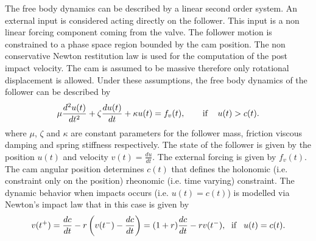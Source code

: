 The free body dynamics can be described by a linear second order
system. An external input is considered acting directly on the
follower. This input is a non linear forcing component coming from
the valve. The follower motion is constrained to a phase space
region bounded by the cam position. The non conservative Newton
restitution law is used for the computation of the post impact
velocity. The cam is assumed to be massive therefore only
rotational displacement is allowed. Under these assumptions, the
free body dynamics of the follower can be described by
\begin{eqnarray}
  \label{eq:sols}
  \mu\frac{d^2u(t)}{dt^2}+\zeta\frac{du(t)}{dt}+\kappa
  u(t)=f_{v}(t),  \; \text{\hspace{5mm} \text{if} \hspace{3mm}$u(t) > c(t)$.}
\end{eqnarray}
where $\mu$, $\zeta$ and $\kappa$ are constant parameters for the
follower mass, friction viscous damping and spring stiffness
 respectively. The state of the
follower is given by the position $u(t)$ and velocity
$v(t)={\frac{du}{dt}}$. The external forcing is given by $f_v(t)$.
The cam angular position determines $c(t)$ that defines the
holonomic (i.e. constraint only on the position) rheonomic (i.e.
time varying) constraint. The dynamic behavior when impacts occurs
(i.e. $u(t) = c(t)$) is modelled via Newton's impact law that in
this case is given by
\begin{eqnarray}
  \label{eq:il}
  v(t^+)=
  \frac{dc}{dt}-r\left(v(t^-)-\frac{dc}{dt}\right)=(1+r)\frac{dc}{dt}-rv(t^-), \; \text{ \text{if}\hspace{3mm}$
u(t)=c(t)$.}
\end{eqnarray}
